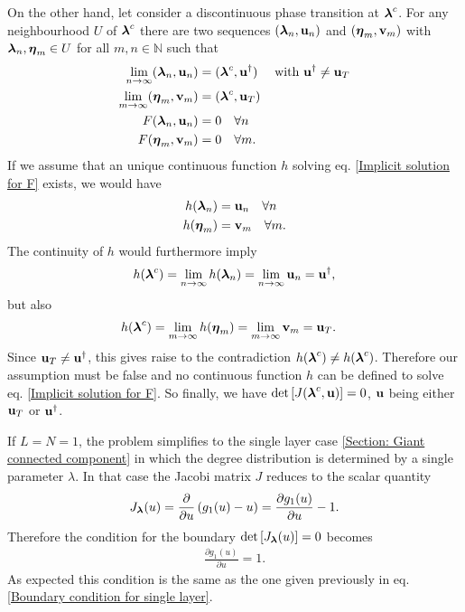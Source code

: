 \documentclass[
11pt, %
english, %
singlespacing, %
nolistspacing, %
liststotoc, %
headsepline, %
]{MastersDoctoralThesis} %
\begin{document}
On the other hand, let consider a discontinuous phase transition at $\boldsymbol{\mathrm{\lambda}}^c$. For any neighbourhood $U$ of $\boldsymbol{\mathrm{\lambda}}^c$ there are two sequences $(\boldsymbol{\mathrm{\lambda}}_n, \boldsymbol{\mathrm{u}}_n)$ and $(\boldsymbol{\mathrm{\eta}}_m, \boldsymbol{\mathrm{v}}_m)$ with $\boldsymbol{\mathrm{\lambda}}_n, \boldsymbol{\mathrm{\eta}}_m \in U$ for all $m, n \in \mathbb{N}$ such that
\begin{align}
	\lim_{n \rightarrow \infty} (\boldsymbol{\mathrm{\lambda}}_n, \boldsymbol{\mathrm{u}}_n) &= (\boldsymbol{\mathrm{\lambda}}^c, \boldsymbol{\mathrm{u}}^\dagger) \quad \text{ with } \boldsymbol{\mathrm{u}}^\dagger \neq \boldsymbol{\mathrm{u}}_T \\
	\lim_{m \rightarrow \infty} (\boldsymbol{\mathrm{\eta}}_m, \boldsymbol{\mathrm{v}}_m) &= (\boldsymbol{\mathrm{\lambda}}^c, \boldsymbol{\mathrm{u}}_T) \\
	F(\boldsymbol{\mathrm{\lambda}}_n, \boldsymbol{\mathrm{u}}_n) &= 0 \quad \forall n \\
	F(\boldsymbol{\mathrm{\eta}}_m, \boldsymbol{\mathrm{v}}_m) &= 0 \quad \forall m.
\end{align}
If we assume that an unique continuous function $h$ solving eq. \eqref{Implicit solution for F} exists, we would have
\begin{align}
	h(\boldsymbol{\mathrm{\lambda}}_n) &= \boldsymbol{\mathrm{u}}_n \quad \forall n \\
	h(\boldsymbol{\mathrm{\eta}}_m) &= \boldsymbol{\mathrm{v}}_m \quad \forall m.
\end{align}
The continuity of $h$ would furthermore imply
\begin{align}
	h(\boldsymbol{\mathrm{\lambda}}^c) = \lim_{n \rightarrow \infty} h(\boldsymbol{\mathrm{\lambda}}_n) = \lim_{n \rightarrow \infty} \boldsymbol{\mathrm{u}}_n = \boldsymbol{\mathrm{u}}^\dagger,
\end{align}
but also
\begin{align}
	h(\boldsymbol{\mathrm{\lambda}}^c) &= \lim_{m \rightarrow \infty} h(\boldsymbol{\mathrm{\eta}}_m) = \lim_{m \rightarrow \infty} \boldsymbol{\mathrm{v}}_m = \boldsymbol{\mathrm{u}}_T.
\end{align}
Since $\boldsymbol{\mathrm{u}}_T \neq \boldsymbol{\mathrm{u}}^\dagger$, this gives raise to the contradiction $h(\boldsymbol{\mathrm{\lambda}}^c) \neq h(\boldsymbol{\mathrm{\lambda}}^c)$. Therefore our assumption must be false and no continuous function $h$ can be defined to solve eq. \eqref{Implicit solution for F}. So finally, we have $\det\left[ J(\boldsymbol{\mathrm{\lambda}}^c, \boldsymbol{\mathrm{u}}) \right] = 0$, $\boldsymbol{\mathrm{u}}$ being either $\boldsymbol{\mathrm{u}}_T$ or $\boldsymbol{\mathrm{u}}^\dagger$.

If $L = N = 1$, the problem simplifies to the single layer case \ref{Section: Giant connected component} in which the degree distribution is determined by a single parameter $\lambda$. In that case the Jacobi matrix $J$ reduces to the scalar quantity
\begin{align}
	J_{\boldsymbol{\mathrm{\lambda}}}(u) = \frac{\partial}{\partial u} \left(g_1(u) - u\right) = \frac{\partial g_1(u)}{\partial u} - 1.
\end{align}
Therefore the condition for the boundary $\det \left[ J_{\boldsymbol{\mathrm{\lambda}}}(u)\right] = 0$ becomes
\begin{align}
	\frac{\partial g_1(u)}{\partial u} = 1.
\end{align}
As expected this condition is the same as the one given previously in eq. \eqref{Boundary condition for single layer}.
\end{document}
